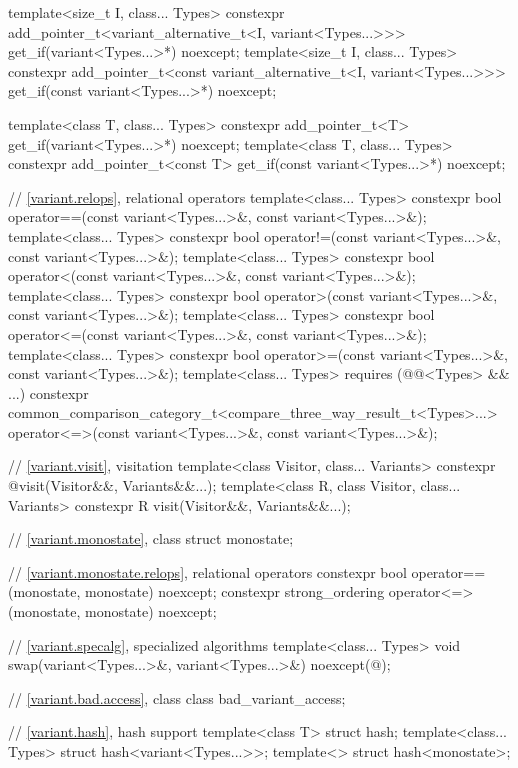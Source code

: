 \begin{codeblock}
{  template<size_t I, class... Types>
    constexpr add_pointer_t<variant_alternative_t<I, variant<Types...>>>
      get_if(variant<Types...>*) noexcept;
  template<size_t I, class... Types>
    constexpr add_pointer_t<const variant_alternative_t<I, variant<Types...>>>
      get_if(const variant<Types...>*) noexcept;

  template<class T, class... Types>
    constexpr add_pointer_t<T>
      get_if(variant<Types...>*) noexcept;
  template<class T, class... Types>
    constexpr add_pointer_t<const T>
      get_if(const variant<Types...>*) noexcept;

  // \ref{variant.relops}, relational operators
  template<class... Types>
    constexpr bool operator==(const variant<Types...>&, const variant<Types...>&);
  template<class... Types>
    constexpr bool operator!=(const variant<Types...>&, const variant<Types...>&);
  template<class... Types>
    constexpr bool operator<(const variant<Types...>&, const variant<Types...>&);
  template<class... Types>
    constexpr bool operator>(const variant<Types...>&, const variant<Types...>&);
  template<class... Types>
    constexpr bool operator<=(const variant<Types...>&, const variant<Types...>&);
  template<class... Types>
    constexpr bool operator>=(const variant<Types...>&, const variant<Types...>&);
  template<class... Types> requires (@@<Types> && ...)
    constexpr common_comparison_category_t<compare_three_way_result_t<Types>...>
      operator<=>(const variant<Types...>&, const variant<Types...>&);

  // \ref{variant.visit}, visitation
  template<class Visitor, class... Variants>
    constexpr @\seebelow@ visit(Visitor&&, Variants&&...);
  template<class R, class Visitor, class... Variants>
    constexpr R visit(Visitor&&, Variants&&...);

  // \ref{variant.monostate}, class 
  struct monostate;

  // \ref{variant.monostate.relops},  relational operators
  constexpr bool operator==(monostate, monostate) noexcept;
  constexpr strong_ordering operator<=>(monostate, monostate) noexcept;

  // \ref{variant.specalg}, specialized algorithms
  template<class... Types>
    void swap(variant<Types...>&, variant<Types...>&) noexcept(@\seebelow@);

  // \ref{variant.bad.access}, class 
  class bad_variant_access;

  // \ref{variant.hash}, hash support
  template<class T> struct hash;
  template<class... Types> struct hash<variant<Types...>>;
  template<> struct hash<monostate>;
}
\end{codeblock}

